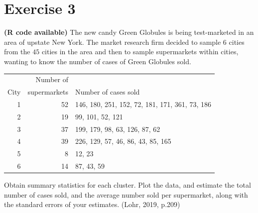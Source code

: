 \documentclass[12pt]{article}
\begin{document}
\section*{Exercise 3}
\textbf{\color{ForestGreen}(R code available)} The new candy Green Globules is being test-marketed in an area of upstate New York. The market research firm decided to sample $6$ cities from the $45$ cities in the area and  then to sample supermarkets within cities, wanting to know the number of cases of
Green Globules sold.
\begin{center}
\begin{tabular}{rrl}
 & Number of &  \\
City& supermarkets & Number of cases sold \\
\hline
1& 52& 146, 180, 251, 152, 72, 181, 171, 361, 73, 186 \\
2& 19& 99, 101, 52, 121\\
3 &37& 199, 179, 98, 63, 126, 87, 62\\
4 &39& 226, 129, 57, 46, 86, 43, 85, 165\\
5 &8 &12, 23\\
6 &14 &87, 43, 59\\
\end{tabular}
\end{center}
Obtain summary statistics for each cluster. Plot the data, and estimate the total number of cases sold, and the average number sold per supermarket, along with the standard errors of your estimates. \hfill (Lohr, 2019, p.209)\\
\end{document}

